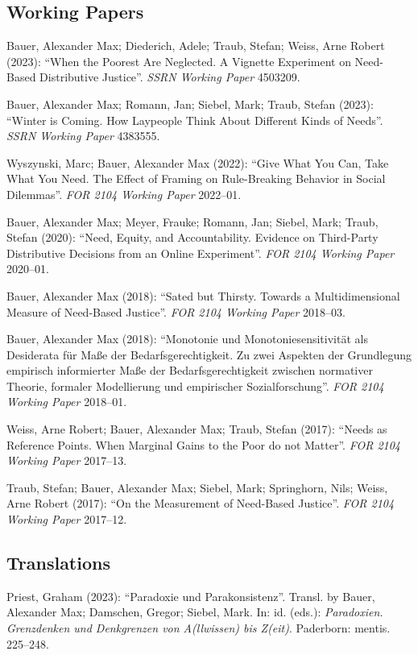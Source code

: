 \documentclass[a4paper,10pt]{article}
\newenvironment{literature}{%
   \parskip6pt\parindent0pt\raggedright
   \def\lititem{\hangindent=1cm\hangafter1}}{%
   \par\ignorespaces}
\begin{document}
\subsection*{Working Papers}
\begin{literature}
\lititem Bauer, Alexander Max; Diederich, Adele; Traub, Stefan; Weiss, Arne Robert (2023): \enquote{When the Poorest Are Neglected. A Vignette Experiment on Need-Based Distributive Justice}. \textit{SSRN Working Paper} 4503209.

\lititem Bauer, Alexander Max; Romann, Jan; Siebel, Mark; Traub, Stefan (2023): \enquote{Winter is Coming. How Laypeople Think About Different Kinds of Needs}. \textit{SSRN Working Paper} 4383555.

\lititem Wyszynski, Marc; Bauer, Alexander Max (2022): \enquote{Give What You Can, Take What You Need. The Effect of Framing on Rule-Breaking Behavior in Social Dilemmas}. \textit{FOR 2104 Working Paper} 2022--01.

\lititem Bauer, Alexander Max; Meyer, Frauke; Romann, Jan; Siebel, Mark; Traub, Stefan (2020): \enquote{Need, Equity, and Accountability. Evidence on Third-Party Distributive Decisions from an Online Experiment}. \textit{FOR 2104 Working Paper} 2020--01.

\lititem Bauer, Alexander Max (2018): \enquote{Sated but Thirsty. Towards a Multidimensional Measure of Need-Based Justice}. \textit{FOR 2104 Working Paper} 2018--03.

\lititem Bauer, Alexander Max (2018): \enquote{Monotonie und Monotoniesensitivität als Desiderata für Maße der Bedarfsgerechtigkeit. Zu zwei Aspekten der Grundlegung empirisch informierter Maße der Bedarfsgerechtigkeit zwischen normativer Theorie, formaler Modellierung und empirischer Sozialforschung}. \textit{FOR 2104 Working Paper} 2018--01.

\lititem Weiss, Arne Robert; Bauer, Alexander Max; Traub, Stefan (2017): \enquote{Needs as Reference Points. When Marginal Gains to the Poor do not Matter}. \textit{FOR 2104 Working Paper} 2017--13.

\lititem Traub, Stefan; Bauer, Alexander Max; Siebel, Mark; Springhorn, Nils; Weiss, Arne Robert (2017): \enquote{On the Measurement of Need-Based Justice}. \textit{FOR 2104 Working Paper} 2017--12.
\end{literature}

\subsection*{Translations}
\begin{literature}
\lititem Priest, Graham (2023): \enquote{Paradoxie und Parakonsistenz}. Transl. by Bauer, Alexander Max; Damschen, Gregor; Siebel, Mark. In: id. (eds.): \textit{Paradoxien. Grenzdenken und Denkgrenzen von A(llwissen) bis Z(eit)}. Paderborn: mentis. 225--248.
\end{literature}
\end{document}
